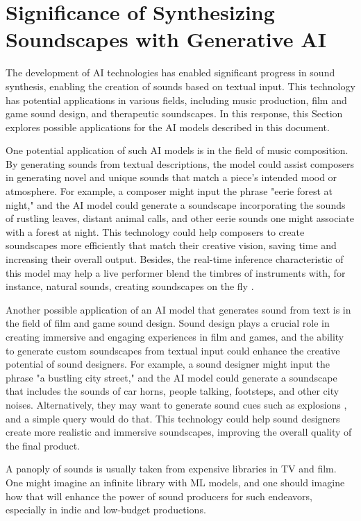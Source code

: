 \section{Significance of Synthesizing Soundscapes with Generative AI} \label{sec:significance}

The development of \ac{AI} technologies has enabled significant progress in sound synthesis, enabling the creation of sounds based on textual input. This technology has potential applications in various fields, including music production, film and game sound design, and therapeutic soundscapes. In this response, this Section explores possible applications for the \ac{AI} models described in this document.

One potential application of such \ac{AI} models is in the field of music composition. By generating sounds from textual descriptions, the model could assist composers in generating novel and unique sounds that match a piece's intended mood or atmosphere. For example, a composer might input the phrase "eerie forest at night," and the \ac{AI} model could generate a soundscape incorporating the sounds of rustling leaves, distant animal calls, and other eerie sounds one might associate with a forest at night. This technology could help composers to create soundscapes more efficiently that match their creative vision, saving time and increasing their overall output. Besides, the real-time inference characteristic of this model may help a live performer blend the timbres of instruments with, for instance, natural sounds, creating soundscapes on the fly \cite{huzaifah_deep_2021}.

Another possible application of an \ac{AI} model that generates sound from text is in the field of film and game sound design. Sound design plays a crucial role in creating immersive and engaging experiences in film and games, and the ability to generate custom soundscapes from textual input could enhance the creative potential of sound designers. For example, a sound designer might input the phrase "a bustling city street," and the \ac{AI} model could generate a soundscape that includes the sounds of car horns, people talking, footsteps, and other city noises. Alternatively, they may want to generate sound cues such as explosions \cite{huzaifah_deep_2021}, and a simple query would do that. This technology could help sound designers create more realistic and immersive soundscapes, improving the overall quality of the final product. 

A panoply of sounds is usually taken from expensive libraries in TV and film. One might imagine an infinite library with \ac{ML} models, and one should imagine how that will enhance the power of sound producers for such endeavors, especially in indie and low-budget productions.